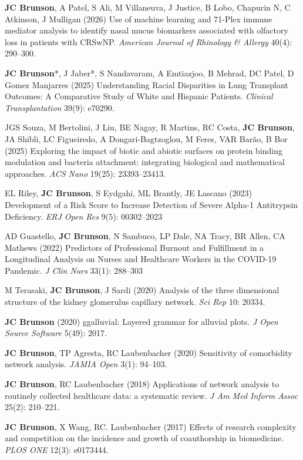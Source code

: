 \documentclass[10pt,a4paper]{article}
\begin{document}
\begin{enumerate}[label={[\arabic*]},labelindent=1cm,nolistsep]
\item
{\bfseries JC Brunson}, A Patel, S Ali, M Villaneuva, J Justice, B Lobo, Chapurin N, C Atkinson, J Mulligan (2026) Use of machine learning and 71-Plex immune mediator analysis to identify nasal mucus biomarkers associated with olfactory loss in patients with CRSwNP. {\itshape American Journal of Rhinology \& Allergy} 40(4): 290--300.
\item
{\bfseries JC Brunson}*, J Jaber*, S Nandavaram, A Emtiazjoo, B Mehrad, DC Patel, D Gomez Manjarres (2025) Understanding Racial Disparities in Lung Transplant Outcomes: A Comparative Study of White and Hispanic Patients. {\itshape Clinical Transplantation} 39(9): e70290.
\item
JGS Souza, M Bertolini, J Liu, BE Nagay, R Martins, RC Costa, {\bfseries JC Brunson}, JA Shibli, LC Figueiredo, A Dongari-Bagtzoglou, M Feres, VAR Bar\~{a}o, B Bor (2025) Exploring the impact of biotic and abiotic surfaces on protein binding modulation and bacteria attachment: integrating biological and mathematical approaches. {\itshape ACS Nano} 19(25): 23393–23413.
\item
EL Riley, {\bfseries JC Brunson}, S Eydgahi, ML Brantly, JE Lascano (2023) Development of a Risk Score to Increase Detection of Severe Alpha-1 Antitrypsin Deficiency. {\itshape ERJ Open Res} 9(5): 00302--2023
\item
AD Guastello, {\bfseries JC Brunson}, N Sambuco, LP Dale, NA Tracy, BR Allen, CA Mathews (2022) Predictors of Professional Burnout and Fulfillment in a Longitudinal Analysis on Nurses and Healthcare Workers in the COVID-19 Pandemic. {\itshape J Clin Nurs} 33(1): 288--303
\item
M Terasaki, {\bfseries JC Brunson}, J Sardi (2020) Analysis of the three dimensional structure of the kidney glomerulus capillary network. {\itshape Sci Rep} 10: 20334.
\item
{\bfseries JC Brunson} (2020) ggalluvial: Layered grammar for alluvial plots. {\itshape J Open Source Software} 5(49): 2017.
\item
{\bfseries JC Brunson}, TP Agresta, RC Laubenbacher (2020) Sensitivity of comorbidity network analysis. {\itshape JAMIA Open} 3(1): 94--103.
\item
{\bfseries JC Brunson}, RC Laubenbacher (2018) Applications of network analysis to routinely collected healthcare data: a systematic review. {\itshape J Am Med Inform Assoc} 25(2): 210--221.
\item
{\bfseries JC Brunson}, X Wang, RC. Laubenbacher (2017) Effects of research complexity and competition on the incidence and growth of coauthorship in biomedicine. {\itshape PLOS ONE} 12(3): e0173444.

\end{enumerate}
\end{document}
